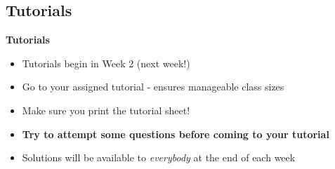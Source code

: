 \documentclass[compress]{beamer}        %
\makeatletter
\newcommand{\tcb}{\textcolor{beamer@blendedblue}}
\makeatother
\begin{document}
%
%
%
%


\subsection{Tutorials}
\begin{frame}{\bf \tcb{Tutorials}}


\begin{itemize}\itemsep1.1cm
\item Tutorials begin in Week 2 (next week!)
\item Go to your assigned tutorial - ensures manageable class sizes
\item Make sure you print the tutorial sheet!
\item {\bf Try to attempt some questions before coming to your tutorial}
\item Solutions will be available to \emph{everybody} at the end of each week
\end{itemize}

\end{frame}
\end{document}
